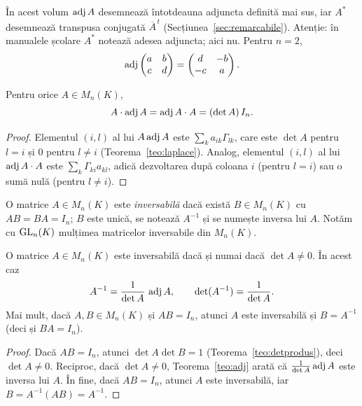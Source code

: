 \begin{observatie}
În acest volum $\operatorname{adj} A$ desemnează întotdeauna adjuncta definită mai sus, iar $A^*$ desemnează transpusa conjugată $\overline{A}^{\,t}$ (Secțiunea~\ref{sec:remarcabile}). Atenție: în manualele școlare $A^*$ notează adesea adjuncta; aici nu. Pentru $n=2$,
\[
\operatorname{adj}\begin{pmatrix}a&b\\c&d\end{pmatrix}=\begin{pmatrix}d&-b\\-c&a\end{pmatrix}.
\]
\end{observatie}

\begin{teorema}\label{teo:adj}
Pentru orice $A\in M_n(K)$,
\[
A\cdot\operatorname{adj} A=\operatorname{adj} A\cdot A=(\det A)\,I_n .
\]
\end{teorema}

\begin{proof}
Elementul $(i,l)$ al lui $A\operatorname{adj} A$ este $\sum_k a_{ik}\Gamma_{lk}$, care este $\det A$ pentru $l=i$ și $0$ pentru $l\neq i$ (Teorema~\ref{teo:laplace}). Analog, elementul $(i,l)$ al lui $\operatorname{adj} A\cdot A$ este $\sum_k\Gamma_{ki}a_{kl}$, adică dezvoltarea după coloana $i$ (pentru $l=i$) sau o sumă nulă (pentru $l\neq i$).
\end{proof}

\begin{definitie}
O matrice $A\in M_n(K)$ este \emph{inversabilă} dacă există $B\in M_n(K)$ cu $AB=BA=I_n$; $B$ este unică, se notează $A^{-1}$ și se numește inversa lui $A$. Notăm cu $\mathrm{GL}_n(K)$ mulțimea matricelor inversabile din $M_n(K)$.
\end{definitie}

\begin{teorema}\label{teo:inversabila}
O matrice $A\in M_n(K)$ este inversabilă dacă și numai dacă $\det A\neq0$. În acest caz
\[
A^{-1}=\frac{1}{\det A}\,\operatorname{adj} A,\qquad \det(A^{-1})=\frac1{\det A}.
\]
Mai mult, dacă $A,B\in M_n(K)$ și $AB=I_n$, atunci $A$ este inversabilă și $B=A^{-1}$ (deci și $BA=I_n$).
\end{teorema}

\begin{proof}
Dacă $AB=I_n$, atunci $\det A\det B=1$ (Teorema~\ref{teo:detprodus}), deci $\det A\neq0$. Reciproc, dacă $\det A\neq0$, Teorema~\ref{teo:adj} arată că $\frac1{\det A}\operatorname{adj} A$ este inversa lui $A$. În fine, dacă $AB=I_n$, atunci $A$ este inversabilă, iar $B=A^{-1}(AB)=A^{-1}$.
\end{proof}

